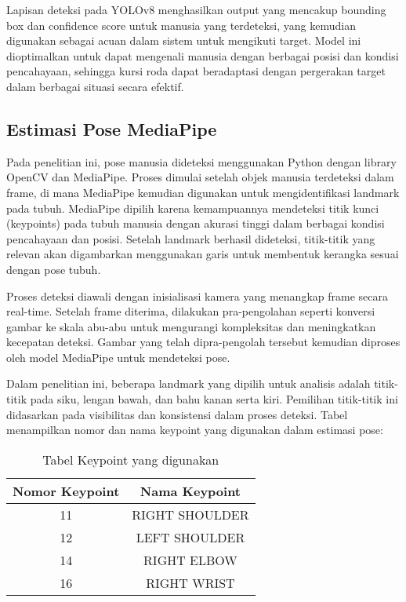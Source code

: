 Lapisan deteksi pada YOLOv8 menghasilkan output yang mencakup bounding box dan confidence score untuk manusia yang terdeteksi, yang kemudian digunakan sebagai acuan dalam sistem untuk mengikuti target. Model ini dioptimalkan untuk dapat mengenali manusia dengan berbagai posisi dan kondisi pencahayaan, sehingga kursi roda dapat beradaptasi dengan pergerakan target dalam berbagai situasi secara efektif.

\subsection{Estimasi Pose MediaPipe}
\label{subsec:estimasi_pose_mediapipe}

Pada penelitian ini, pose manusia dideteksi menggunakan Python dengan library OpenCV dan MediaPipe. Proses dimulai setelah objek manusia terdeteksi dalam frame, di mana MediaPipe kemudian digunakan untuk mengidentifikasi landmark pada tubuh. MediaPipe dipilih karena kemampuannya mendeteksi titik kunci (keypoints) pada tubuh manusia dengan akurasi tinggi dalam berbagai kondisi pencahayaan dan posisi. Setelah landmark berhasil dideteksi, titik-titik yang relevan akan digambarkan menggunakan garis untuk membentuk kerangka sesuai dengan pose tubuh.

Proses deteksi diawali dengan inisialisasi kamera yang menangkap frame secara real-time. Setelah frame diterima, dilakukan pra-pengolahan seperti konversi gambar ke skala abu-abu untuk mengurangi kompleksitas dan meningkatkan kecepatan deteksi. Gambar yang telah dipra-pengolah tersebut kemudian diproses oleh model MediaPipe untuk mendeteksi pose.

Dalam penelitian ini, beberapa landmark yang dipilih untuk analisis adalah titik-titik pada siku, lengan bawah, dan bahu kanan serta kiri. Pemilihan titik-titik ini didasarkan pada visibilitas dan konsistensi dalam proses deteksi. Tabel menampilkan nomor dan nama keypoint yang digunakan dalam estimasi pose:

\begin{table}[H]
  \centering
  \caption{Tabel Keypoint yang digunakan}
  \label{tab:keypoints}
  \begin{tabular}{|c|c|}
    \hline
    Nomor Keypoint & Nama Keypoint \\
    \hline
    11 & RIGHT SHOULDER \\
    12 & LEFT SHOULDER \\
    14 & RIGHT ELBOW \\
    16 & RIGHT WRIST \\
    \hline
  \end{tabular}
\end{table}

